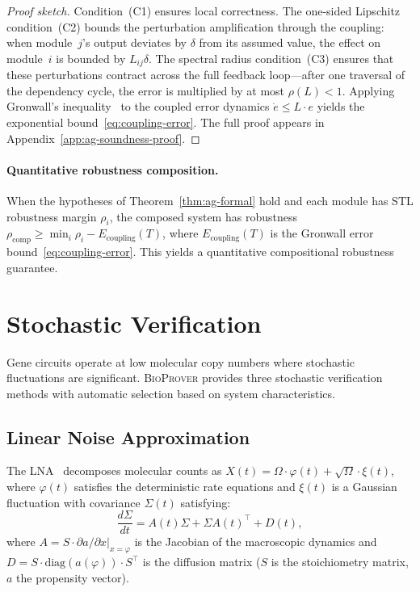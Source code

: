 \documentclass[11pt]{article}
\newcommand{\bioprover}{\textsc{BioProver}}
\begin{document}
\begin{proof}[Proof sketch]
Condition~(C1) ensures local correctness. The one-sided Lipschitz
condition~(C2) bounds the perturbation amplification through the
coupling: when module~$j$'s output deviates by $\delta$ from
its assumed value, the effect on module~$i$ is bounded by
$L_{ij}\delta$. The spectral radius condition~(C3) ensures that
these perturbations contract across the full feedback loop---after
one traversal of the dependency cycle, the error is multiplied by
at most $\rho(L) < 1$. Applying Gronwall's
inequality~\cite{gronwall1919note} to the coupled error dynamics
$\dot{e} \leq L \cdot e$ yields the exponential bound~\eqref{eq:coupling-error}.
The full proof appears in Appendix~\ref{app:ag-soundness-proof}.
\end{proof}

\paragraph{Quantitative robustness composition.}
When the hypotheses of Theorem~\ref{thm:ag-formal} hold and each
module has STL robustness margin $\rho_i$, the composed system has
robustness $\rho_{\text{comp}} \geq \min_i \rho_i - E_{\text{coupling}}(T)$,
where $E_{\text{coupling}}(T)$ is the Gronwall error
bound~\eqref{eq:coupling-error}. This yields a quantitative
compositional robustness guarantee.

\section{Stochastic Verification}
\label{sec:stochastic}

Gene circuits operate at low molecular copy numbers where stochastic
fluctuations are significant. \bioprover{} provides three stochastic
verification methods with automatic selection based on system
characteristics.

\subsection{Linear Noise Approximation}

The LNA~\cite{vankampen2007stochastic} decomposes molecular counts
as $X(t) = \Omega \cdot \varphi(t) + \sqrt{\Omega} \cdot \xi(t)$,
where $\varphi(t)$ satisfies the deterministic rate equations and
$\xi(t)$ is a Gaussian fluctuation with covariance $\Sigma(t)$
satisfying:
\begin{equation}
  \frac{d\Sigma}{dt} = A(t)\Sigma + \Sigma A(t)^\top + D(t),
\end{equation}
where $A = S \cdot \partial a / \partial x|_{x=\varphi}$ is the
Jacobian of the macroscopic dynamics and
$D = S \cdot \text{diag}(a(\varphi)) \cdot S^\top$ is the diffusion
matrix ($S$ is the stoichiometry matrix, $a$ the propensity vector).
\end{document}
